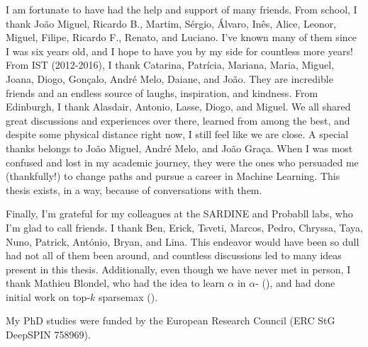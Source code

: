 \begin{acknowledgments}
    I am fortunate to have had the help and support of many friends.
    From school, I thank João Miguel, Ricardo B., Martim, Sérgio,
    Álvaro, Inês, Alice, Leonor, Miguel, Filipe, Ricardo F., Renato,
    and Luciano. I've known many of them since I was six years old,
    and I hope to have you by my side for countless more years! From
    IST (2012-2016), I thank Catarina, Patrícia, Mariana, Maria,
    Miguel, Joana, Diogo, Gonçalo, André Melo, Daiane, and João. They are
    incredible friends and an endless source of laughs, inspiration,
    and kindness. From Edinburgh, I thank Alasdair, Antonio, Lasse,
    Diogo, and Miguel. We all shared great discussions and
    experiences over there, learned from among the best, and despite
    some physical distance right now, I still feel like we are
    close. A special thanks belongs to João Miguel, André Melo, and
    João Graça. When I was most confused and lost in my academic
    journey, they were the ones who persuaded me (thankfully!) to
    change paths and pursue a career in Machine Learning. This thesis
    exists, in a way, because of conversations with them.
    
    Finally, I'm grateful for my colleagues at the SARDINE and
    Probabll labs, who I'm glad to call friends. I thank Ben, Erick,
    Tsveti, Marcos, Pedro, Chryssa, Taya, Nuno, Patrick, António,
    Bryan, and Lina. This endeavor would have been so dull had not
    all of them been around, and countless discussions led to many
    ideas present in this thesis. Additionally, even though we have
    never met in person, I thank Mathieu Blondel, who had the idea to
    learn $\alpha$ in $\alpha$-\entmaxtext
    (), and had done initial work on
    top-$k$ sparsemax ().
    
    My PhD studies were funded by the European Research Council (ERC
    StG DeepSPIN 758969).
    
\end{acknowledgments}
\clearpage
\thispagestyle{empty}
\cleardoublepage
